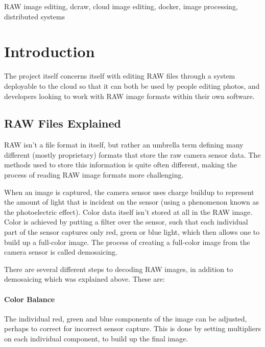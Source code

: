 \documentclass[10pt,a4paper]{article}
\begin{document}
\begin{abstract}
\end{abstract}

\begin{keywords}
RAW image editing, dcraw, cloud image editing, docker, image processing, distributed systems
\end{keywords}

\section{Introduction}

The project itself concerns itself with editing RAW files through a system deployable to the cloud
so that it can both be used by people editing photos, and developers looking to work with RAW image formats
within their own software.

\subsection{RAW Files Explained}
RAW isn't a file format in itself, but rather an umbrella term defining many different (mostly proprietary) formats that store the
raw camera sensor data. The methods used to store this information is quite often different, making the process of reading
RAW image formats more challenging.

When an image is captured, the camera sensor uses charge buildup to represent the amount of light that is incident on the sensor
(using a phenomenon known as the photoelectric effect). Color data itself isn't stored at all in the RAW image. Color is achieved
by putting a filter over the sensor, such that each individual part of the sensor captures only red, green or blue light, which then
allows one to build up a full-color image. The process of creating a full-color image from the camera sensor is called demosaicing. 
\cite{UnderstandingRAWCapture}

There are several different steps to decoding RAW images, in addition to demosaicing which was explained above. These are:

\paragraph{Color Balance}
The individual red, green and blue components of the image can be adjusted, perhaps to correct for incorrect sensor capture.
This is done by setting multipliers on each individual component, to build up the final image.
\end{document}
